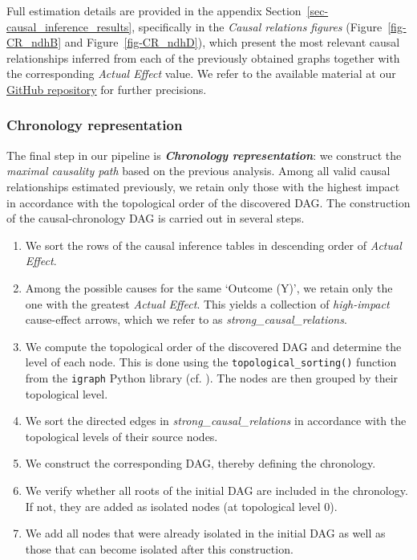 \documentclass[
]{article}
\theoremstyle{definition}
\theoremstyle{remark}
\begin{document}
Full estimation details are provided in the appendix
Section~\ref{sec-causal_inference_results}, specifically in the
\emph{Causal relations figures} (Figure~\ref{fig-CR_ndhB} and
Figure~\ref{fig-CR_ndhD}), which present the most relevant causal
relationships inferred from each of the previously obtained graphs
together with the corresponding \emph{Actual Effect} value. We refer to
the available material at our
\href{https://github.com/cambroise/chloroDAG}{GitHub repository} for
further precisions.

\subsubsection{Chronology
representation}\label{chronology-representation}

The final step in our pipeline is \textbf{\emph{Chronology
representation}}: we construct the \emph{maximal causality path} based
on the previous analysis. Among all valid causal relationships estimated
previously, we retain only those with the highest impact in accordance
with the topological order of the discovered DAG. The construction of
the causal-chronology DAG is carried out in several steps.

\begin{enumerate}
\def\labelenumi{\roman{enumi}.}
\item
  We sort the rows of the causal inference tables in descending order of
  \emph{Actual Effect}.
\item
  Among the possible causes for the same `Outcome (Y)', we retain only
  the one with the greatest \emph{Actual Effect}. This yields a
  collection of \emph{high-impact} cause-effect arrows, which we refer
  to as \emph{strong\_causal\_relations}.
\item
  We compute the topological order of the discovered DAG and determine
  the level of each node. This is done using the
  \texttt{topological\_sorting()} function from the \texttt{igraph}
  Python library (cf. ). The nodes
  are then grouped by their topological level.
\item
  We sort the directed edges in \emph{strong\_causal\_relations} in
  accordance with the topological levels of their source nodes.
\item
  We construct the corresponding DAG, thereby defining the chronology.
\item
  We verify whether all roots of the initial DAG are included in the
  chronology. If not, they are added as isolated nodes (at topological
  level \(0\)).
\item
  We add all nodes that were already isolated in the initial DAG as well
  as those that can become isolated after this construction.
\end{enumerate}
\end{document}
